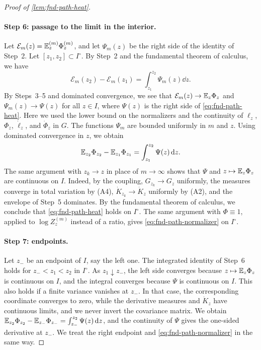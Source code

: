 \begin{proof}[Proof of \cref{lem:fnd-path-heat}]
\paragraph{Step 6: passage to the limit in the interior.}
Let $\mathcal E_m(z)=\mathbb E^{(m)}_z\Phi^{(m)}_z$, and let $\Psi_m(z)$ be the
right side of the identity of Step~2. Let $[z_1,z_2]\subset I^\circ$.
By Step~2 and the fundamental theorem of calculus, we have
\[
 \mathcal E_m(z_2)-\mathcal E_m(z_1)=\int_{z_1}^{z_2}\Psi_m(z)\dd z .
\]
By Steps~3--5 and dominated convergence, we see that
$\mathcal E_m(z)\to\mathbb E_z\Phi_z$
and $\Psi_m(z)\to\Psi(z)$ for all $z\in I$, where
$\Psi(z)$ is the right side of \eqref{eq:fnd-path-heat}. Here we used the
lower bound on the normalizers and the continuity of $\ell_z$, $\Phi_z$,
$\dot\ell_z$, and $\dot\Phi_z$ in $G$. The
functions $\Psi_m$ are bounded uniformly in $m$ and $z$. Using dominated
convergence in $z$, we obtain
\[
 \mathbb E_{z_2}\Phi_{z_2}-\mathbb E_{z_1}\Phi_{z_1}=\int_{z_1}^{z_2}\Psi(z)\,\mathrm d z .
\]
The same argument with $z_k\to z$ in place of $m\to\infty$ shows that
$\Psi$ and $z\mapsto\mathbb E_z\Phi_z$ are continuous on $I$. Indeed, by the
coupling, $G_{z_k}\to G_z$ uniformly, the measures converge in total
variation by (A4), $\dot K_{z_k}\to\dot K_z$ uniformly by (A2), and the
envelope of Step~5 dominates. By the fundamental theorem of calculus, we
conclude that
\eqref{eq:fnd-path-heat} holds on $I^\circ$. The same argument with
$\Phi\equiv1$, applied to $\log Z^{(m)}_z$ instead of a ratio, gives
\eqref{eq:fnd-path-normalizer} on $I^\circ$.

\paragraph{Step 7: endpoints.}
Let $z_-$ be an endpoint of $I$, say the left one. The integrated
identity of Step~6 holds for $z_-<z_1<z_2$ in $I^\circ$. As
$z_1\downarrow z_-$, the left side converges because $z\mapsto\mathbb E_z\Phi_z$
is continuous on $I$, and the integral converges because $\Psi$ is
continuous on $I$. This also holds if a finite variance vanishes at $z_-$.
In that case,
the corresponding coordinate converges to zero, while the derivative
measures and $\dot K_z$ have continuous limits, and we never invert the
covariance matrix. We obtain
$\mathbb E_{z_2}\Phi_{z_2}-\mathbb E_{z_-}\Phi_{z_-}=\int_{z_-}^{z_2}\Psi(z)\,\mathrm d z$,
and the continuity of $\Psi$ gives the one-sided derivative at
$z_-$. We treat the right endpoint and \eqref{eq:fnd-path-normalizer} in the
same way.
\end{proof}
